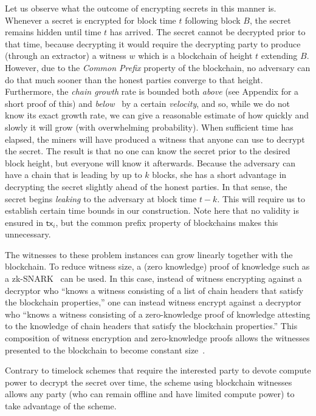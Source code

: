 Let us observe what the outcome of encrypting secrets in this manner is. Whenever a secret is encrypted
for block time $t$ following block $B$, the secret remains hidden until time $t$ has arrived.
The secret cannot be decrypted prior to that time, because decrypting it would require the decrypting party
to produce (through an extractor) a witness $w$ which is a blockchain of height $t$ extending $B$. However,
due to the \emph{Common Prefix} property of the blockchain, no adversary can do that much sooner than the
honest parties converge to that height. Furthermore, the \emph{chain growth} rate is bounded both \emph{above} (see
Appendix for a short proof of this)
and \emph{below}~\cite{backbone} by a certain \emph{velocity}, and so, while we do not know its exact growth rate, we can give
a reasonable estimate of how quickly and slowly it will grow (with overwhelming probability).
When sufficient time has elapsed, the miners will have produced a witness that anyone can use to decrypt the
secret. The result is that no one can know the secret prior to the desired block height, but everyone will
know it afterwards. Because the adversary can have a chain that is leading by up to $k$ blocks, she has
a short advantage in decrypting the secret slightly ahead of the honest parties. In that sense, the
secret begins \emph{leaking} to the adversary at block time $t - k$. This will require us to establish
certain time bounds in our construction.
Note here that no validity is ensured in $\textsf{tx}_i$, but the common prefix property of blockchains
makes this unnecessary.

The witnesses to these problem instances can grow linearly together with the blockchain. To reduce witness
size, a (zero knowledge) proof of knowledge such as a zk-SNARK~\cite{EPRINT:BCTV13} can be used.
In this case, instead of
witness encrypting against a decryptor who
``knows a witness consisting of a list of chain headers that satisfy the blockchain properties,''
one can instead witness encrypt against a decryptor who
``knows a witness consisting of a zero-knowledge proof of knowledge attesting to the knowledge of chain headers
that satisfy the blockchain properties.'' This composition of witness encryption and zero-knowledge proofs
allows the witnesses presented to the blockchain to become constant size~\cite{timelock-bitcoin}.

Contrary to timelock schemes that require the interested party to devote compute power to decrypt the secret
over time, the scheme using blockchain witnesses allows any party (who can remain offline and have limited compute
power) to take advantage of the scheme.

